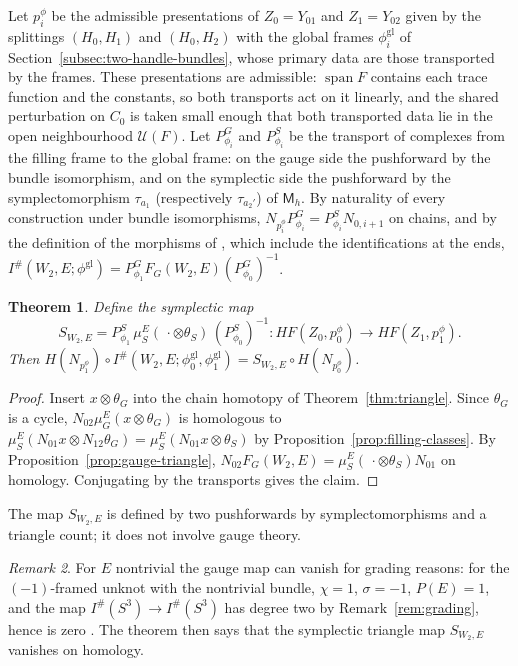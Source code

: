 \documentclass[11pt]{amsart}
\newtheorem{theorem}{Theorem}[section]
\theoremstyle{definition}
\theoremstyle{remark}
\newtheorem{remark}[theorem]{Remark}
\theoremstyle{plain}
\numberwithin{equation}{section}
\newcommand{\Ish}{I^{\#}}
\newcommand{\HF}{\mathit{HF}}
\newcommand{\Msf}{\mathsf{M}}
\begin{document}
Let $p_i^{\phi}$ be the admissible presentations of $Z_0=Y_{01}$ and
$Z_1=Y_{02}$ given by the splittings $(H_0,H_1)$ and $(H_0,H_2)$ with the
global frames $\phi_i^{\mathrm{gl}}$ of Section~\ref{subsec:two-handle-bundles},
whose primary data are those transported by the frames. These presentations are admissible:
$\operatorname{span}F$ contains each trace function and the constants, so both transports act on
it linearly, and the shared perturbation on $C_0$ is taken small enough that both transported
data lie in the open neighbourhood $\mathcal U(F)$.
Let $P^G_{\phi_i}$ and $P^S_{\phi_i}$ be the transport of complexes from the
filling frame to the global frame: on the gauge side the pushforward by the
bundle isomorphism, and on the symplectic side the pushforward by the
symplectomorphism $\tau_{a_1}$ (respectively $\tau_{a_2'}$) of $\Msf_h$. By
naturality of every construction under bundle isomorphisms,
$N_{p_i^\phi}P^G_{\phi_i}=P^S_{\phi_i}N_{0,i+1}$ on chains, and by the definition
of the morphisms of \cite{KM-unknot}, which include the identifications at the
ends, $\Ish(W_2,E;\phi^{\mathrm{gl}})=P^G_{\phi_1}F_G(W_2,E)(P^G_{\phi_0})^{-1}$.

\begin{theorem}\label{thm:two-handle}
Define the symplectic map
\[
S_{W_2,E}=P^S_{\phi_1}\,\mu_S^E(\,\cdot\otimes\theta_S)\,(P^S_{\phi_0})^{-1}
\colon\HF(Z_0,p_0^\phi)\to\HF(Z_1,p_1^\phi).
\]
Then $H(N_{p_1^\phi})\circ\Ish(W_2,E;\phi_0^{\mathrm{gl}},\phi_1^{\mathrm{gl}})
=S_{W_2,E}\circ H(N_{p_0^\phi})$.
\end{theorem}

\begin{proof}
Insert $x\otimes\theta_G$ into the chain homotopy of
Theorem~\ref{thm:triangle}. Since $\theta_G$ is a cycle,
$N_{02}\mu_G^E(x\otimes\theta_G)$ is homologous to
$\mu_S^E(N_{01}x\otimes N_{12}\theta_G)=\mu_S^E(N_{01}x\otimes\theta_S)$ by
Proposition~\ref{prop:filling-classes}. By
Proposition~\ref{prop:gauge-triangle}, $N_{02}F_G(W_2,E)=\mu_S^E(\,\cdot
\otimes\theta_S)N_{01}$ on homology. Conjugating by the transports gives the
claim.
\end{proof}

The map $S_{W_2,E}$ is defined by two pushforwards by symplectomorphisms and
a triangle count; it does not involve gauge theory.

\begin{remark}
For $E$ nontrivial the gauge map can vanish for grading reasons: for
the $(-1)$-framed unknot with the nontrivial bundle, $\chi=1$,
$\sigma=-1$, $P(E)=1$, and the map $\Ish(S^3)\to\Ish(S^3)$ has degree
two by Remark~\ref{rem:grading}, hence is zero
\cite[Section~7.6]{Scaduto}. The theorem then says that the symplectic
triangle map $S_{W_2,E}$ vanishes on homology.
\end{remark}
\end{document}
